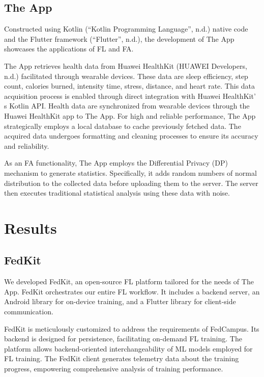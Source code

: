 \documentclass{article}
\begin{document}
\subsection{The App}

Constructed using Kotlin (``Kotlin Programming Language'', n.d.) native
code and the Flutter framework (``Flutter'', n.d.), the development of
The App showcases the applications of FL and FA.

The App retrieves health data from Huawei HealthKit (HUAWEI Developers,
n.d.) facilitated through wearable devices. These data are sleep
efficiency, step count, calories burned, intensity time, stress,
distance, and heart rate. This data acquisition process is enabled
through direct integration with Huawei HealthKit' s
Kotlin API. Health data are synchronized from wearable devices through
the Huawei HealthKit app to The App. For high and reliable performance,
The App strategically employs a local database to cache previously
fetched data. The acquired data undergoes formatting and cleaning
processes to ensure its accuracy and reliability.

As an FA functionality, The App employs the Differential Privacy (DP)
mechanism to generate statistics. Specifically, it adds random numbers
of normal distribution to the collected data before uploading them to
the server. The server then executes traditional statistical analysis
using these data with noise.

\section{Results}

\subsection{FedKit}

We developed FedKit, an open-source FL platform tailored for the needs
of The App. FedKit orchestrates our entire FL workflow. It includes a
backend server, an Android library for on-device training, and a Flutter
library for client-side communication.

FedKit is meticulously customized to address the requirements of
FedCampus. Its backend is designed for persistence, facilitating
on-demand FL training. The platform allows backend-oriented
interchangeability of ML models employed for FL training. The FedKit
client generates telemetry data about the training progress, empowering
comprehensive analysis of training performance.
\end{document}
